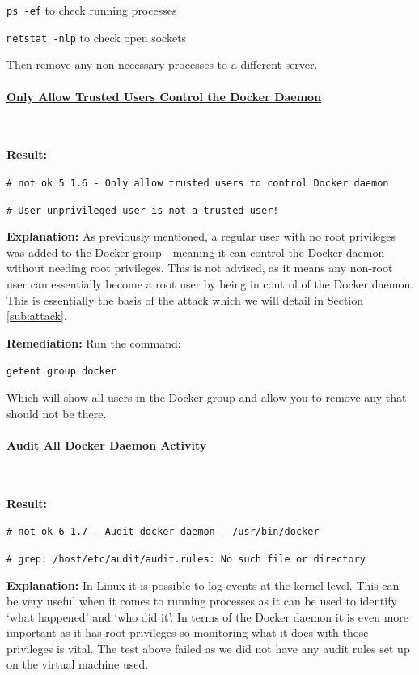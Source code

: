 \documentclass{article}
\begin{document}
\texttt{ps -ef} to check running processes

\texttt{netstat -nlp} to check open sockets

Then remove any non-necessary processes to a different server.

\paragraph{\underline{Only Allow Trusted Users Control the Docker Daemon}}\mbox{}\\
\label{par:untrusted}

\textbf{Result:} 

\texttt{\# not ok 5 1.6  - Only allow trusted users to control Docker daemon}

\texttt{\# User unprivileged-user is not a trusted user!}

\textbf{Explanation:} As previously mentioned, a regular user with no root privileges was added to the Docker group - meaning it can control the Docker daemon without needing root privileges. This is not advised, as it means any non-root user can essentially become a root user by being in control of the Docker daemon. This is essentially the basis of the attack which we will detail in Section \ref{sub:attack}.

\textbf{Remediation:} Run the command:

\texttt{getent group docker}

Which will show all users in the Docker group and allow you to remove any that should not be there. 

\paragraph{\underline{Audit All Docker Daemon Activity}}\mbox{}\\
\label{par:audit}

\textbf{Result:} 

\texttt{\# not ok 6 1.7  - Audit docker daemon - /usr/bin/docker}

\texttt{\# grep: /host/etc/audit/audit.rules: No such file or directory}

\textbf{Explanation:} In Linux it is possible to log events at the kernel level. This can be very useful when it comes to running processes as it can be used to identify `what happened' and `who did it'. In terms of the Docker daemon it is even more important as it has root privileges so monitoring what it does with those privileges is vital. The test above failed as we did not have any audit rules set up on the virtual machine used. 
\end{document}

